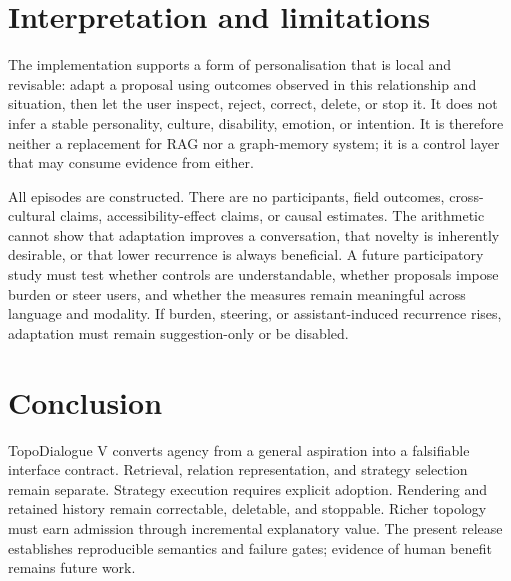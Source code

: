 \documentclass[11pt,a4paper]{article}
\begin{document}
\section{Interpretation and limitations}
The implementation supports a form of personalisation that is local and revisable: adapt a proposal using outcomes observed in this relationship and situation, then let the user inspect, reject, correct, delete, or stop it. It does not infer a stable personality, culture, disability, emotion, or intention. It is therefore neither a replacement for RAG nor a graph-memory system; it is a control layer that may consume evidence from either.

All episodes are constructed. There are no participants, field outcomes, cross-cultural claims, accessibility-effect claims, or causal estimates. The arithmetic cannot show that adaptation improves a conversation, that novelty is inherently desirable, or that lower recurrence is always beneficial. A future participatory study must test whether controls are understandable, whether proposals impose burden or steer users, and whether the measures remain meaningful across language and modality. If burden, steering, or assistant-induced recurrence rises, adaptation must remain suggestion-only or be disabled.

\section{Conclusion}
TopoDialogue V converts agency from a general aspiration into a falsifiable interface contract. Retrieval, relation representation, and strategy selection remain separate. Strategy execution requires explicit adoption. Rendering and retained history remain correctable, deletable, and stoppable. Richer topology must earn admission through incremental explanatory value. The present release establishes reproducible semantics and failure gates; evidence of human benefit remains future work.


\end{document}
